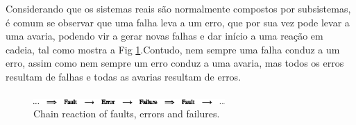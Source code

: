 \documentclass[10pt,fleqn,a4paper]{article}
\begin{document}
Considerando que os sistemas reais são normalmente compostos por subsistemas, é
comum se observar que uma falha leva a um erro, que por sua vez pode levar a uma
avaria, podendo vir a gerar novas falhas e dar início a uma reação em cadeia,
tal como mostra a Fig \ref{fig:chain_reaction}.Contudo, nem sempre uma falha
conduz a um erro, assim como nem sempre um erro conduz a uma avaria, mas todos
os erros resultam de falhas e todas as avarias resultam de erros.

\begin{figure}[htb]
\centering
    \includegraphics[width=0.65\textwidth]{imgs/chain_reaction}
    \caption{Chain reaction of faults, errors and failures.}
    \label{fig:chain_reaction}
\end{figure}

\end{document}
